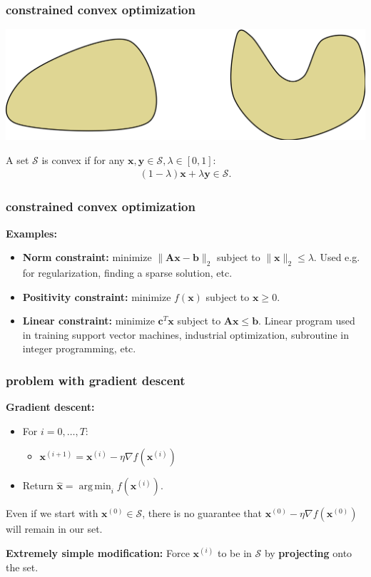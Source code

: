 \documentclass[compress]{beamer}
\newcommand{\bv}[1]{\mathbf{#1}}
\DeclareMathOperator*{\argmin}{arg\,min}
\begin{document}
\begin{frame}[t]
	\frametitle{constrained convex optimization}
	\begin{center}
		\includegraphics[width=.7\textwidth]{sets.png}
	\end{center}

	\begin{definition}
		A set $\mathcal{S}$ is convex if for any $\bv{x}, \bv{y} \in \mathcal{S}, \lambda \in [0,1]$:
		\begin{align*}
			(1-\lambda)\bv{x} + \lambda\bv{y} \in \mathcal{S}.
		\end{align*}
	\end{definition}
\end{frame}

\begin{frame}[t]
	\frametitle{constrained convex optimization}
	\textbf{Examples:}
	\begin{itemize}
		\item \textbf{Norm constraint:} minimize $\|\bv{A}\bv{x} - \bv{b}\|_2$ subject to $\|\bv{x}\|_2 \leq \lambda$. Used e.g. for regularization, finding a sparse solution, etc.
		\item \textbf{Positivity constraint:} minimize $f(\bv{x})$ subject to $\bv{x} \geq 0$. 
		\item \textbf{Linear constraint:} minimize $\bv{c}^T\bv{x}$ subject to $\bv{A}\bv{x} \leq \bv{b}$. Linear program used in training support vector machines, industrial optimization, subroutine in integer programming, etc.
	\end{itemize}
\end{frame}

\begin{frame}[t]
	\frametitle{problem with gradient descent}
	\textbf{Gradient descent:}
	\begin{itemize}
		\item For $i = 0,\ldots, T$:
		\begin{itemize}
			\item $\bv{x}^{(i+1)} = \bv{x}^{(i)} - \eta \nabla f(\bv{x}^{(i)})$
		\end{itemize}
		\item Return $\hat{\bv{x}} = \argmin_{i} f(\bv{x}^{(i)})$.
	\end{itemize}
	
	\begin{center}
		\alert{
		Even if we start with $\bv{x}^{(0)} \in \mathcal{S}$, there is no guarantee that $ \bv{x}^{(0)} - \eta \nabla f(\bv{x}^{(0)})$ will remain in our set.}
	\end{center}

	\textbf{Extremely simple modification:} Force $\bv{x}^{(i)}$ to be in $\mathcal{S}$ by \textbf{\alert{projecting}} onto the set.
\end{frame}
\end{document}
